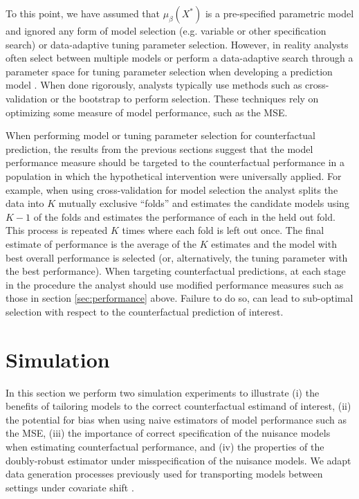 To this point, we have assumed that $\mu_{\beta}(X^*)$ is a pre-specified parametric model and ignored any form of model selection (e.g. variable or other specification search) or data-adaptive tuning parameter selection. However, in reality analysts often select between multiple models or perform a data-adaptive search through a parameter space for tuning parameter selection when developing a prediction model \cite{steyerberg_clinical_2019}. When done rigorously, analysts typically use methods such as cross-validation or the bootstrap to perform selection. These techniques rely on optimizing some measure of model performance, such as the MSE.

When performing model or tuning parameter selection for counterfactual prediction, the results from the previous sections suggest that the model performance measure should be targeted to the counterfactual performance in a population in which the hypothetical intervention were universally applied. For example, when using cross-validation for model selection the analyst splits the data into $K$ mutually exclusive ``folds'' and estimates the candidate models using $K - 1$ of the folds and estimates the performance of each in the held out fold. This process is repeated $K$ times where each fold is left out once. The final estimate of performance is the average of the $K$ estimates and the model with best overall performance is selected (or, alternatively, the tuning parameter with the best performance). When targeting counterfactual predictions, at each stage in the procedure the analyst should use modified performance measures such as those in section \ref{sec:performance} above. Failure to do so, can lead to sub-optimal selection with respect to the counterfactual prediction of interest. 


\section{Simulation} \label{sec:simulation}
In this section we perform two simulation experiments to illustrate (i) the benefits of tailoring models to the correct counterfactual estimand of interest, (ii) the potential for bias when using naive estimators of model performance such as the MSE, (iii) the importance of correct specification of the nuisance models when estimating counterfactual performance, and (iv) the properties of the doubly-robust estimator under misspecification of the nuisance models. We adapt data generation processes previously used for transporting models between settings under covariate shift \cite{steingrimsson_transporting_2021,morrison_robust_2022}.

